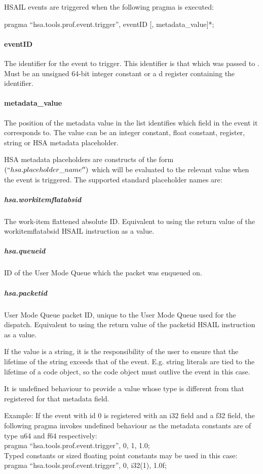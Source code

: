 \documentclass[oneside]{book}
\begin{document}
HSAIL events are triggered when the following pragma is executed:

pragma ``hsa.tools.prof.event.trigger'', eventID [, metadata_value]*;  


\paragraph{eventID}
The identifier for the event to trigger. This identifier is that which was passed to . Must be an unsigned 64-bit integer constant or a d register containing the identifier.

\paragraph{metadata_value}
The position of the metadata value in the list identifies which field in the event it corresponds to. The value can be an integer constant, float constant, register, string or HSA metadata placeholder. 

HSA metadata placeholders are constructs of the form $(``hsa.placeholder\_name'')$ which will be evaluated to the relevant value when the event is triggered. The supported standard placeholder names are:

\subparagraph{hsa.workitemflatabsid} The work-item flattened absolute ID. Equivalent to using the return value of the workitemflatabsid HSAIL instruction as a value.
\subparagraph{hsa.queueid} ID of the User Mode Queue which the packet was enqueued on.
\subparagraph{hsa.packetid} User Mode Queue packet ID, unique to the User Mode Queue used for the dispatch. Equivalent to using the return value of the packetid HSAIL instruction as a value.

If the value is a string, it is the responsibility of the user to ensure that the lifetime of the string exceeds that of the event. E.g. string literals are tied to the lifetime of a code object, so the code object must outlive the event in this case.

It is undefined behaviour to provide a value whose type is different from that registered for that metadata field.

Example:
If the event with id 0 is registered with an i32 field and a f32 field, the following pragma invokes undefined behaviour as the metadata constants are of type u64 and f64 respectively:\\
pragma ``hsa.tools.prof.event.trigger'', 0, 1, 1.0;\\
Typed constants or sized floating point constants may be used in this case:\\
pragma ``hsa.tools.prof.event.trigger'', 0, i32(1), 1.0f;\\
\end{document}
